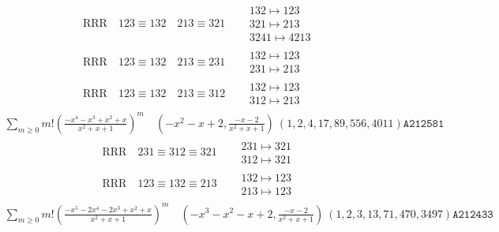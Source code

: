 \documentclass{article}
\begin{document}
\begin{align}
\text{RRR}
\quad
123\equiv132
\quad
213\equiv321
\quad
&
\begin{matrix}
132 \mapsto 123
\\
321 \mapsto 213
\\
3241 \mapsto 4213
\end{matrix}
\\
\text{RRR}
\quad
123\equiv132
\quad
213\equiv231
\quad
&
\begin{matrix}
132 \mapsto 123
\\
231 \mapsto 213
\end{matrix}
\\
\text{RRR}
\quad
123\equiv132
\quad
213\equiv312
\quad
&
\begin{matrix}
132 \mapsto 123
\\
312 \mapsto 213
\end{matrix}
\end{align}
$$
\begin{matrix}
\sum_{m \geq 0} m! \left(
\frac{-x^{4} - x^{3} + x^{2} + x}{x^{2} + x + 1}
\right)^m
\quad
\left(-x^{2} - x + 2, \frac{-x - 2}{x^{2} + x + 1}\right)
\ 
\left(1, 2, 4, 17, 89, 556, 4011\right)
\texttt{
A212581
}
\end{matrix}
$$
\begin{align}
\text{RRR}
\quad
231\equiv312\equiv321
\quad
&
\begin{matrix}
231 \mapsto 321
\\
312 \mapsto 321
\end{matrix}
\\
\text{RRR}
\quad
123\equiv132\equiv213
\quad
&
\begin{matrix}
132 \mapsto 123
\\
213 \mapsto 123
\end{matrix}
\end{align}
$$
\begin{matrix}
\sum_{m \geq 0} m! \left(
\frac{-x^{5} - 2 x^{4} - 2 x^{3} + x^{2} + x}{x^{2} + x + 1}
\right)^m
\quad
\left(-x^{3} - x^{2} - x + 2, \frac{-x - 2}{x^{2} + x + 1}\right)
\ 
\left(1, 2, 3, 13, 71, 470, 3497\right)
\texttt{
A212433
}
\end{matrix}
$$
\end{document}
